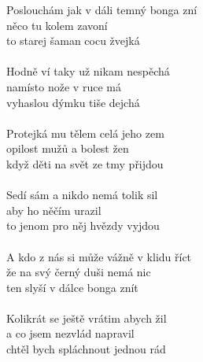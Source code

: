 
Poslou\A chám jak v dáli \D temný bonga \FisMi zní\\
něco tu \E kolem zavo\D ní\\
to starej \A šaman cocu \E žvejká\\\\

Hodně ví taky už nikam nespěchá\\
namísto nože v ruce má\\
vyhaslou dýmku tiše dejchá\\\\

Protejká mu tělem celá jeho zem\\
opilost mužů a bolest žen\\
když děti na svět ze tmy přijdou\\\\

Sedí sám a nikdo nemá tolik sil\\
aby ho něčím urazil\\
to jenom pro něj hvězdy vyjdou\\\\

A kdo z nás si může vážně v klidu říct\\
že na svý černý duši nemá nic\\
ten slyší v dálce bonga znít\\\\

Kolikrát se ještě vrátim abych žil\\
a co jsem nezvlád napravil\\
chtěl bych spláchnout jednou rád      